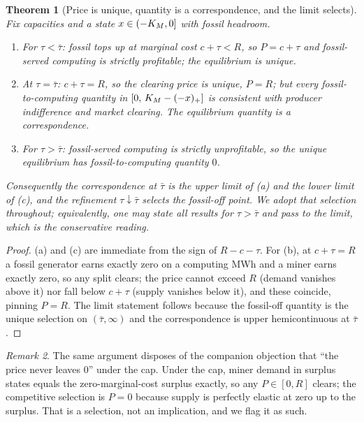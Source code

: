 \documentclass[11pt,reqno]{amsart}
\theoremstyle{plain}\newtheorem{theorem}{Theorem}\newtheorem{proposition}[theorem]{Proposition}
\theoremstyle{definition}\newtheorem{definition}[theorem]{Definition}
\theoremstyle{remark}\newtheorem{remark}[theorem]{Remark}
\begin{document}
\begin{theorem}[Price is unique, quantity is a correspondence, and the limit selects]\label{thm:selection}
Fix capacities and a state $x\in(-K_M,0]$ with fossil headroom.
\begin{enumerate}[label=\textup{(\alph*)},leftmargin=2.2em]
  \item For $\tau<\bar\tau$: fossil tops up at marginal cost $c+\tau<R$, so $P=c+\tau$ and
        fossil-served computing is strictly profitable; the equilibrium is unique.
  \item At $\tau=\bar\tau$: $c+\tau=R$, so the clearing price is \emph{unique}, $P=R$; but
        every fossil-to-computing quantity in $[0,\,K_M-(-x)_+]$ is consistent with producer
        indifference and market clearing. The equilibrium \emph{quantity} is a correspondence.
  \item For $\tau>\bar\tau$: fossil-served computing is strictly unprofitable, so the unique
        equilibrium has fossil-to-computing quantity $0$.
\end{enumerate}
Consequently the correspondence at $\bar\tau$ is the upper limit of (a) and the lower limit
of (c), and the refinement $\tau\downarrow\bar\tau$ selects the fossil-off point. We adopt
that selection throughout; equivalently, one may state all results for $\tau>\bar\tau$ and
pass to the limit, which is the conservative reading.
\end{theorem}
\begin{proof}
(a) and (c) are immediate from the sign of $R-c-\tau$. For (b), at $c+\tau=R$ a fossil
generator earns exactly zero on a computing MWh and a miner earns exactly zero, so any
split clears; the price cannot exceed $R$ (demand vanishes above it) nor fall below $c+\tau$
(supply vanishes below it), and these coincide, pinning $P=R$. The limit statement follows
because the fossil-off quantity is the unique selection on $(\bar\tau,\infty)$ and the
correspondence is upper hemicontinuous at $\bar\tau$.
\end{proof}

\begin{remark}
The same argument disposes of the companion objection that ``the price never leaves $0$''
under the cap. Under the cap, miner demand in surplus states equals the zero-marginal-cost
surplus exactly, so any $P\in[0,R]$ clears; the competitive selection is $P=0$ because
supply is perfectly elastic at zero up to the surplus. That is a selection, not an
implication, and we flag it as such.
\end{remark}
\end{document}
